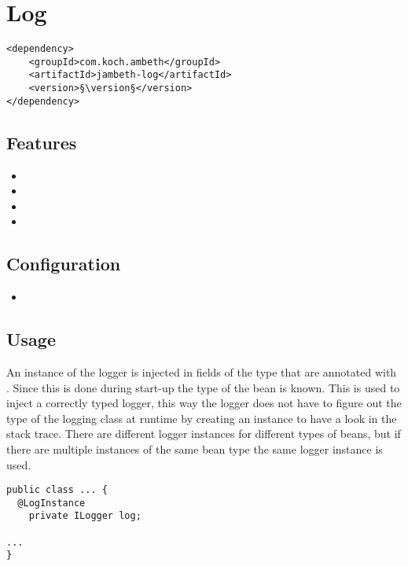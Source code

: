 \section{Log}
\label{module:Log}
\ClearAPI
\TODO
\begin{lstlisting}[style=POM,caption={Maven modules to use \emph{Ambeth Log}}]
<dependency>
	<groupId>com.koch.ambeth</groupId>
	<artifactId>jambeth-log</artifactId>
	<version>§\version§</version>
</dependency>
\end{lstlisting}
\subsection{Features}
\begin{itemize}
	\item {}
	\item {}
	\item {}
	\item {}
\end{itemize}

\subsection{Configuration}
\begin{itemize}
	\item {}
\end{itemize}

\subsection{Usage}
An instance of the \AMBETH logger is injected in fields of the type  that are annotated with . Since this is done during start-up the type of the bean is known. This is used to inject a correctly typed logger, this way the logger does not have to figure out the type of the logging class at runtime by creating an  instance to have a look in the stack trace. There are different logger instances for different types of beans, but if there are multiple instances of the same bean type the same logger instance is used.

\begin{lstlisting}[style=Java,caption={Example of a logger injection field}]
public class ... {
  @LogInstance
	private ILogger log;

...
}
\end{lstlisting}
